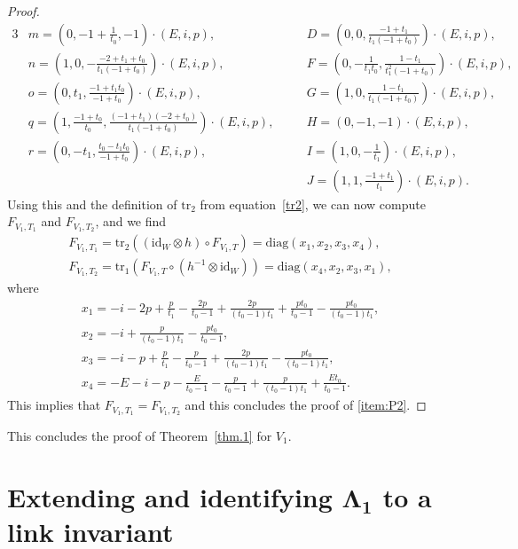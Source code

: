 \documentclass[10pt,a4paper]{amsart}
\numberwithin{equation}{section}
\theoremstyle{definition}
\begin{document}
\begin{proof}
\begin{alignat*}{3}
&m = \left(0, -1 + \frac{1}{t_0}, -1 \right) \cdot (E,i,p) ,\qquad &&
D = \left(0, 0, \frac{-1+t_1}{t_1(-1+t_0)}\right) \cdot (E,i,p) ,&\\
&n = \left(1, 0, -\frac{-2+t_1+t_0}{t_1(-1+t_0)} \right) \cdot (E,i,p) ,\qquad &&
F = \left(0, -\frac{1}{t_1 t_0}, \frac{1-t_1}{t_1^2(-1+t_0)} \right) \cdot (E,i,p) ,&\\
&o = \left(0, t_1, \frac{-1+t_1 t_0}{-1+t_0} \right) \cdot (E,i,p) ,\qquad&&
G = \left(1, 0, \frac{1-t_1}{t_1(-1+t_0)}\right) \cdot (E,i,p) ,&\\
&q = \left(1, \frac{-1+t_0}{t_0}, \frac{(-1+t_1)(-2+t_0)}{t_1(-1+t_0)}\right) \cdot (E,i,p) ,\quad &&
H = (0, -1, -1) \cdot (E,i,p) ,&\\
&r = \left(0, -t_1, \frac{t_0-t_1 t_0}{-1+t_0} \right) \cdot (E,i,p) ,\qquad &&
I = \left(1, 0, -\frac{1}{t_1}\right) \cdot (E,i,p) ,&\\
&&& J = \left(1, 1, \frac{-1+t_1}{t_1}\right) \cdot (E,i,p) .&
\end{alignat*}
Using this and the definition of $\mathrm{tr}_2$ from equation~\eqref{tr2}, we can now
compute $F_{V_1,T_1}$ and $F_{V_1,T_2}$, and we find
\begin{gather*}
F_{V_1,T_1}  = \mathrm{tr}_{2} ((\mathrm{id}_W \otimes h) \circ F_{V_1,T})
= \mathrm{diag}(x_1,x_2,x_3,x_4), \\
F_{V_1,T_2}  = \mathrm{tr}_{1} (F_{V_1,T}
\circ (h^{-1} \otimes \mathrm{id}_W)) = \mathrm{diag}(x_4,x_2,x_3,x_1),
\end{gather*}
where
\begin{gather*}
 x_1  = - i - 2 p + \frac{p}{t_1} - \frac{2 p}{t_0-1}
+ \frac{2 p}{(t_0-1)t_1} + \frac{p t_0}{t_0-1} - \frac{p t_0}{(t_0-1)t_1},
\\
x_2  = - i + \frac{p}{(t_0-1)t_1} - \frac{p t_0}{t_0-1},
\\
x_3  = - i - p + \frac{p}{t_1} - \frac{p}{t_0-1} + \frac{2 p}{(t_0-1)t_1}
- \frac{p t_0}{(t_0-1)t_1},
\\
x_4  = -E - i - p - \frac{E}{t_0-1} - \frac{p}{t_0-1} + \frac{p}{(t_0-1)t_1}
+ \frac{E t_0}{t_0-1}.
\end{gather*}
This implies that $F_{V_1,T_1}=F_{V_1,T_2}$ and this
concludes the proof of \eqref{item:P2}.
\end{proof}

This concludes the proof of Theorem~\ref{thm.1} for $V_1$.

\section[Extending and identifying Lambda\_1 to a link invariant]{Extending and identifying $\boldsymbol{\Lambda_1}$ to a link invariant}
\label{sec:L1}
\end{document}
